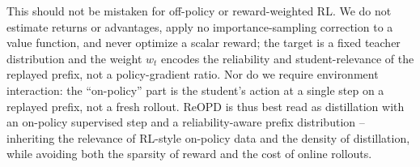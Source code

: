 This should not be mistaken for off-policy or reward-weighted RL. We do not estimate
returns or advantages, apply no importance-sampling correction to a value function,
and never optimize a scalar reward; the target is a fixed teacher distribution and
the weight \(w_t\) encodes the reliability and student-relevance of the replayed
prefix, not a policy-gradient ratio. Nor do we require environment interaction: the
``on-policy'' part is the
student's action at a single step on a replayed prefix, not a fresh rollout. ReOPD is
thus best read as distillation with an on-policy supervised step and a
reliability-aware prefix distribution -- inheriting the relevance of RL-style
on-policy data and the density of distillation, while avoiding both the sparsity of
reward and the cost of online rollouts.
